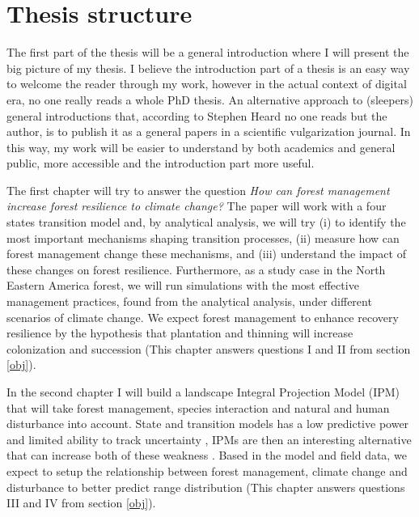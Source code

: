 
\section{Thesis structure}

The first part of the thesis will be a general introduction where I will present the big picture of my thesis.
I believe the introduction part of a thesis is an easy way to welcome the reader through my work, however in the actual context of digital era, no one really reads a whole PhD thesis.
An alternative approach to (sleepers) general introductions that, according to Stephen Heard\footnotemark{} no one reads but the author, is to publish it as a general papers in a scientific vulgarization journal.
In this way, my work will be easier to understand by both academics and general public, more accessible and the introduction part more useful.

The first chapter will try to answer the question \textit{How can forest management increase forest resilience to climate change?}
The paper will work with a four states transition model and, by analytical analysis, we will try (i) to identify the most important mechanisms shaping transition processes, (ii) measure how can forest management change these mechanisms, and (iii) understand the impact of these changes on forest resilience.
Furthermore, as a study case in the North Eastern America forest, we will run simulations with the most effective management practices, found from the analytical analysis, under different scenarios of climate change.
We expect forest management to enhance recovery resilience by the hypothesis that plantation and thinning will increase colonization and succession (This chapter answers questions I and II from section \ref{obj}).


In the second chapter I will build a landscape Integral Projection Model (IPM) that will take forest management, species interaction and natural and human disturbance into account.
State and transition models has a low predictive power and limited ability to track uncertainty \parencite{Bashari2008,Phillips2011}, IPMs are then an interesting alternative that can increase both of these weakness \parencite{Elderd2016}.
Based in the model and field data, we expect to setup the relationship between forest management, climate change and disturbance to better predict range distribution (This chapter answers questions III and IV from section \ref{obj}).

